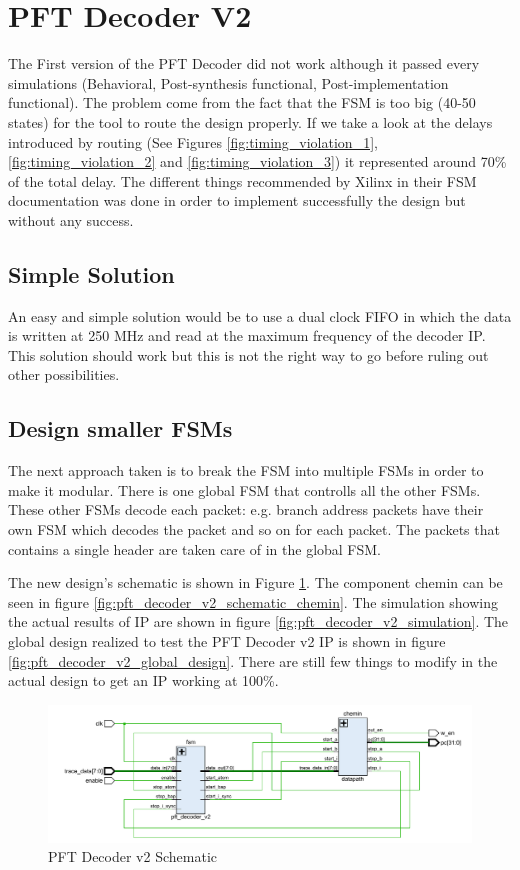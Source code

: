 \documentclass[10pt,a4paper, oneside]{memoir}
\begin{document}
\section{PFT Decoder V2}
The First version of the PFT Decoder did not work although it passed every simulations (Behavioral, Post-synthesis functional, Post-implementation functional). The problem come from the fact that the FSM is too big (40-50 states) for the tool to route the design properly. If we take a look at the delays introduced by routing (See Figures \ref{fig:timing_violation_1}, \ref{fig:timing_violation_2} and \ref{fig:timing_violation_3}) it represented around 70\% of the total delay. The different things recommended by Xilinx in their FSM documentation was done in order to implement successfully the design but without any success. 

\subsection{Simple Solution}
An easy and simple solution would be to use a dual clock FIFO in which the data is written at 250 MHz and read at the maximum frequency of the decoder IP. This solution should work but this is not the right way to go before ruling out other possibilities. 

\subsection{Design smaller FSMs}
The next approach taken is to break the FSM into multiple FSMs in order to make it modular. There is one global FSM that controlls all the other FSMs. These other FSMs decode each packet: e.g. branch address packets have their own FSM which decodes the packet and so on for each packet. The packets that contains a single header are taken care of in the global FSM. 

The new design's schematic is shown in Figure \ref{fig:pft_decoder_v2_schematic}. The component chemin can be seen in figure \ref{fig:pft_decoder_v2_schematic_chemin}. The simulation showing the actual results of IP are shown in figure \ref{fig:pft_decoder_v2_simulation}. The global design realized to test the PFT Decoder v2 IP is shown in figure \ref{fig:pft_decoder_v2_global_design}. There are still few things to modify in the actual design to get an IP working at 100\%.

\begin{figure}
\centering
\includegraphics[scale=.7, keepaspectratio]{images/pft_decoder_v2_schematic}
\caption{PFT Decoder v2 Schematic}
\label{fig:pft_decoder_v2_schematic}
\end{figure}
\end{document}
